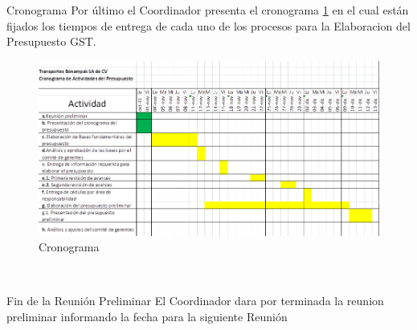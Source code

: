 \documentclass[12pt,letterpaper]{article}
\begin{document}
{\begin{section}
      \newpage
    \begin{subsection}
    {\color{kgreen}Cronograma}
Por \'ultimo el Coordinador presenta el cronograma \ref{crono} en el cual est\'an fijados los tiempos de entrega de cada uno de los procesos para la Elaboracion  del Presupuesto GST.
  \begin{center}
  
		\begin{figure}[htb]
		    \centering
		    \includegraphics[angle=0,width=150mm]{img/cronograma.png}
		    \caption{Cronograma}
		    \label{crono}
		\end{figure}
	\end{center}
	  \\
    \end{subsection}
    
      \newpage
    \begin{subsection}
    {\color{kgreen}Fin de la Reuni\'on Preliminar}
	  El Coordinador dara por terminada la reunion preliminar informando la fecha para la siguiente Reuni\'on
	  \\
    \end{subsection}
    
%   
%  
	

\end{section}}
\end{document}
